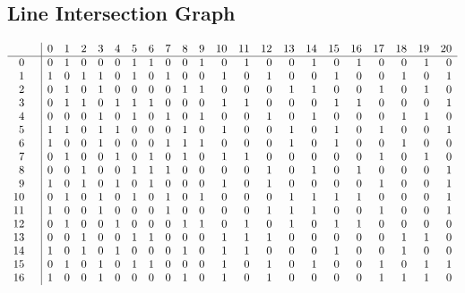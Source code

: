\documentclass{article}
\begin{document}
{\subsection*{Line Intersection Graph}
{\arraycolsep=1pt
$$
\begin{array}{rr|*{21}r}
 &  & 0 & 1 & 2 & 3 & 4 & 5 & 6 & 7 & 8 & 9 & 10 & 11 & 12 & 13 & 14 & 15 & 16 & 17 & 18 & 19 & 20\\
\hline
0 &  & 0 & 1 & 0 & 0 & 0 & 1 & 1 & 0 & 0 & 1 & 0 & 1 & 0 & 0 & 1 & 0 & 1 & 0 & 0 & 1 & 0\\
1 &  & 1 & 0 & 1 & 1 & 0 & 1 & 0 & 1 & 0 & 0 & 1 & 0 & 1 & 0 & 0 & 1 & 0 & 0 & 1 & 0 & 1\\
2 &  & 0 & 1 & 0 & 1 & 0 & 0 & 0 & 0 & 1 & 1 & 0 & 0 & 0 & 1 & 1 & 0 & 0 & 1 & 0 & 1 & 0\\
3 &  & 0 & 1 & 1 & 0 & 1 & 1 & 1 & 0 & 0 & 0 & 1 & 1 & 0 & 0 & 0 & 1 & 1 & 0 & 0 & 0 & 1\\
4 &  & 0 & 0 & 0 & 1 & 0 & 1 & 0 & 1 & 0 & 1 & 0 & 0 & 1 & 0 & 1 & 0 & 0 & 0 & 1 & 1 & 0\\
5 &  & 1 & 1 & 0 & 1 & 1 & 0 & 0 & 0 & 1 & 0 & 1 & 0 & 0 & 1 & 0 & 1 & 0 & 1 & 0 & 0 & 1\\
6 &  & 1 & 0 & 0 & 1 & 0 & 0 & 0 & 1 & 1 & 1 & 0 & 0 & 0 & 1 & 0 & 1 & 0 & 0 & 1 & 0 & 0\\
7 &  & 0 & 1 & 0 & 0 & 1 & 0 & 1 & 0 & 1 & 0 & 1 & 1 & 0 & 0 & 0 & 0 & 0 & 1 & 0 & 1 & 0\\
8 &  & 0 & 0 & 1 & 0 & 0 & 1 & 1 & 1 & 0 & 0 & 0 & 0 & 1 & 0 & 1 & 0 & 1 & 0 & 0 & 0 & 1\\
9 &  & 1 & 0 & 1 & 0 & 1 & 0 & 1 & 0 & 0 & 0 & 1 & 0 & 1 & 0 & 0 & 0 & 0 & 1 & 0 & 0 & 1\\
10 &  & 0 & 1 & 0 & 1 & 0 & 1 & 0 & 1 & 0 & 1 & 0 & 0 & 0 & 1 & 1 & 1 & 1 & 0 & 0 & 0 & 1\\
11 &  & 1 & 0 & 0 & 1 & 0 & 0 & 0 & 1 & 0 & 0 & 0 & 0 & 1 & 1 & 1 & 0 & 0 & 1 & 0 & 0 & 1\\
12 &  & 0 & 1 & 0 & 0 & 1 & 0 & 0 & 0 & 1 & 1 & 0 & 1 & 0 & 1 & 0 & 1 & 1 & 0 & 0 & 0 & 0\\
13 &  & 0 & 0 & 1 & 0 & 0 & 1 & 1 & 0 & 0 & 0 & 1 & 1 & 1 & 0 & 0 & 0 & 0 & 0 & 1 & 1 & 0\\
14 &  & 1 & 0 & 1 & 0 & 1 & 0 & 0 & 0 & 1 & 0 & 1 & 1 & 0 & 0 & 0 & 1 & 0 & 0 & 1 & 0 & 0\\
15 &  & 0 & 1 & 0 & 1 & 0 & 1 & 1 & 0 & 0 & 0 & 1 & 0 & 1 & 0 & 1 & 0 & 0 & 1 & 0 & 1 & 1\\
16 &  & 1 & 0 & 0 & 1 & 0 & 0 & 0 & 0 & 1 & 0 & 1 & 0 & 1 & 0 & 0 & 0 & 0 & 1 & 1 & 1 & 0\\

\end{array}$$}}
\end{document}
